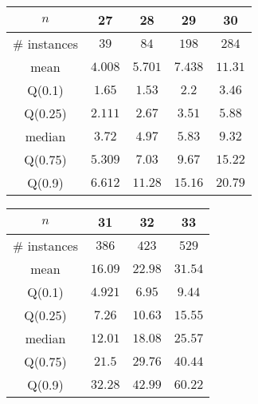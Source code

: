 \begin{tabular}{c|cccc} 
\hline 
$n$ & 27 & 28 & 29 & 30 \tabularnewline 
\hline 
\hline 
\# instances & $39$ & $84$ & $198$ & $284$ \tabularnewline 
mean & $4.008$ & $5.701$ & $7.438$ & $11.31$ \tabularnewline 
Q(0.1) & $1.65$ & $1.53$ & $2.2$ & $3.46$ \tabularnewline 
Q(0.25) & $2.111$ & $2.67$ & $3.51$ & $5.88$ \tabularnewline 
median & $3.72$ & $4.97$ & $5.83$ & $9.32$ \tabularnewline 
Q(0.75) & $5.309$ & $7.03$ & $9.67$ & $15.22$ \tabularnewline 
Q(0.9) & $6.612$ & $11.28$ & $15.16$ & $20.79$ \tabularnewline 
\hline 
\end{tabular} 
\medskip{} 

\begin{tabular}{c|ccc} 
\hline 
$n$ & 31 & 32 & 33 \tabularnewline 
\hline 
\hline 
\# instances & $386$ & $423$ & $529$ \tabularnewline 
mean & $16.09$ & $22.98$ & $31.54$ \tabularnewline 
Q(0.1) & $4.921$ & $6.95$ & $9.44$ \tabularnewline 
Q(0.25) & $7.26$ & $10.63$ & $15.55$ \tabularnewline 
median & $12.01$ & $18.08$ & $25.57$ \tabularnewline 
Q(0.75) & $21.5$ & $29.76$ & $40.44$ \tabularnewline 
Q(0.9) & $32.28$ & $42.99$ & $60.22$ \tabularnewline 
\hline 
\end{tabular} 
\medskip{} 

